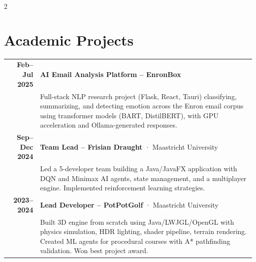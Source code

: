 \documentclass[lighthipster]{simplehipstercv}
\begin{document}
\begin{paracol}{2}
\vspace{1.2em}

\section*{Academic Projects}

\begin{tabular}{r| p{}}
    \textbf{Feb--Jul 2025} & \textbf{AI Email Analysis Platform -- EnronBox} \\
    & {\footnotesize Full-stack NLP research project (Flask, React, Tauri) classifying, summarizing, and detecting emotion across the Enron email corpus using transformer models (BART, DistilBERT), with GPU acceleration and Ollama-generated responses.} \\[0.7em]

    \textbf{Sep--Dec 2024} & \textbf{Team Lead -- Frisian Draught} · Maastricht University \\
    & {\footnotesize Led a 5-developer team building a Java/JavaFX application with DQN and Minimax AI agents, state management, and a multiplayer engine. Implemented reinforcement learning strategies.} \\[0.7em]

    \textbf{2023--2024} & \textbf{Lead Developer -- PotPotGolf} · Maastricht University \\
    & {\footnotesize Built 3D engine from scratch using Java/LWJGL/OpenGL with physics simulation, HDR lighting, shader pipeline, terrain rendering. Created ML agents for procedural courses with A* pathfinding validation. Won best project award.} \\
\end{tabular}

\vspace{1.2em}

\begin{minipage}[t]{0.45\textwidth}

\end{minipage}
\end{paracol}
\end{document}
